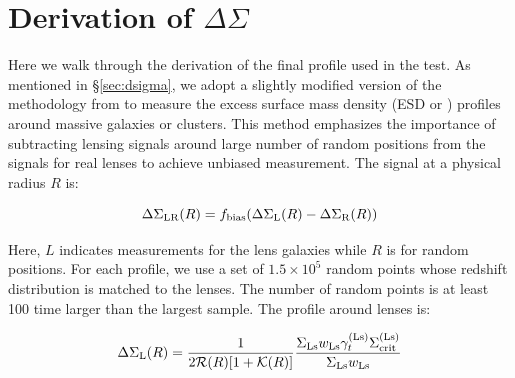 \documentclass[fleqn,usenatbib,useAMS,english]{mnras}
\begin{document}




\appendix

\section{Derivation of $\Delta\Sigma$}
    \label{app:dsigma_detail}

    Here we walk through the derivation of the final \dsigma{} profile used in the \topn{} test.
    As mentioned in \S \ref{sec:dsigma}, we adopt a slightly modified version of the methodology
    from \citet{Singh2017} to measure the excess surface mass density (ESD or \dsigma{}) profiles
    around massive galaxies or clusters.
    This method emphasizes the importance of subtracting lensing signals around large number of
    random positions from the signals for real lenses to achieve unbiased measurement.
    The \dsigma{} signal at a physical radius $R$ is:

    \begin{equation}
        {\Delta\Sigma}_{\rm LR}(R) =
        f_{\rm bias}({\Delta\Sigma}_{\mathrm{L}}(R) - {\Delta\Sigma}_{\mathrm{R}}(R))
        \label{eq:ds1}
    \end{equation}

    Here, $L$ indicates measurements for the lens galaxies while $R$ is for random positions.
    For each \dsigma{} profile, we use a set of $1.5 \times 10^5$ random points whose redshift
    distribution is matched to the lenses.
    The number of random points is at least 100 time larger than the largest \topn{} sample.
    The \dsigma{} profile around lenses is:

    \begin{equation}
        {\Delta\Sigma}_{\rm L}(R) = \frac{1}{2 \mathcal{R}(R) [1+\mathcal{K}(R)]}
            \frac{\Sigma_{\rm Ls} w_{\rm Ls} \gamma_{t}^{(\rm Ls)}
            \Sigma_{\rm crit}^{(\rm Ls)}}{\Sigma_{\rm Ls} w_{\rm Ls}}
        \label{eq:ds2}
    \end{equation}
\end{document}
